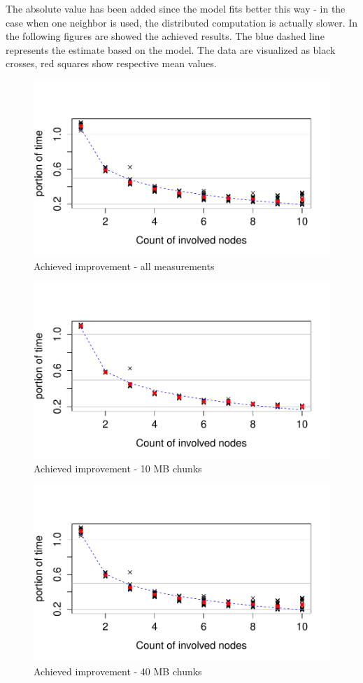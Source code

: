The absolute value has been added since the model fits better this way -
in the case when one neighbor is used, the distributed computation is
actually slower. In the following figures are showed the achieved
results. The blue dashed line represents the estimate based on the
model. The data are visualized as black crosses, red squares show
respective mean values.

\begin{figure}[h]
\begin{center}
\includegraphics[scale=0.90]{./img/Rplot.pdf}
\caption{Achieved improvement - all measurements}
\end{center}
\end{figure}

\begin{figure}[h]
\begin{center}
\includegraphics[scale=0.90]{./img/Rplot10k.pdf}
\caption{Achieved improvement - 10 MB chunks}
\end{center}
\end{figure}

\begin{figure}[h]
\begin{center}
\includegraphics[scale=0.90]{./img/Rplot.pdf}
\caption{Achieved improvement - 40 MB chunks}
\end{center}
\end{figure}
